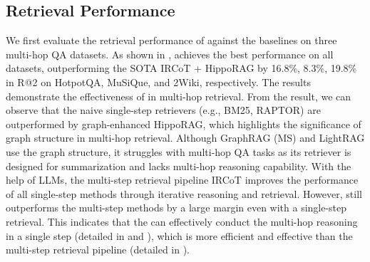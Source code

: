 



\subsection{Retrieval Performance}\label{sec:retrieval}
We first evaluate the retrieval performance of \ourmethod against the baselines on three multi-hop QA datasets. As shown in , \ourmethod achieves the best performance on all datasets, outperforming the SOTA IRCoT + HippoRAG by 16.8\%, 8.3\%, 19.8\% in R@2 on HotpotQA, MuSiQue, and 2Wiki, respectively. The results demonstrate the effectiveness of \ourmethod in multi-hop retrieval. From the result, we can observe that the naive single-step retrievers (e.g., BM25, RAPTOR) are outperformed by graph-enhanced HippoRAG, which highlights the significance of graph structure in multi-hop retrieval. Although GraphRAG (MS) and LightRAG use the graph structure, it struggles with multi-hop QA tasks as its retriever is designed for summarization and lacks multi-hop reasoning capability.
With the help of LLMs, the multi-step retrieval pipeline IRCoT improves the performance of all single-step methods through iterative reasoning and retrieval. However, \ourmethod still outperforms the multi-step methods by a large margin even with a single-step retrieval. This indicates that the \ourmethod can effectively conduct the multi-hop reasoning in a single step (detailed in  and ), which is more efficient and effective than the multi-step retrieval pipeline (detailed in ).

